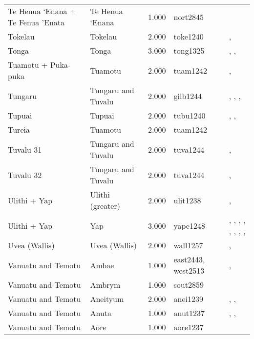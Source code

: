 \begin{longtable}{p{1.8cm}p{1.8cm}p{1.8cm}p{2cm}p{7cm}}
  Te Henua ‘Enana + Te Fenua ’Enata & Te Henua ‘Enana & 1.000 & nort2845 & \citet{sahlins1958social} \\ 
  Tokelau & Tokelau & 2.000 & toke1240 & \citet{hooper1973demographic}, \citet{macgregor1937} \\ 
  Tonga & Tonga & 3.000 & tong1325 & \citet{kirch1984evolution}, \citet{cummins1977tongan}, \citet{ferdon1988early} \\ 
  Tuamotu + Puka-puka & Tuamotu & 2.000 & tuam1242 & \citet{emory1975material}, \citet{emory1975material} \\ 
  Tungaru & Tungaru and Tuvalu & 2.000 & gilb1244 & \citet{lambert1966}, \citet{lambert1975makin}, \citet{lambert1991}, \citet{macdonald1982cinderellas} \\ 
  Tupuai & Tupuai & 2.000 & tubu1240 & \citet{aitken1930ethnology}, \citet{bollt2008excavations}, \citet{edwards2003archaeological} \\ 
  Tureia & Tuamotu & 2.000 & tuam1242 & \citet{emory1975material} \\ 
  Tuvalu 31 & Tungaru and Tuvalu & 2.000 & tuva1244 & \citet{macdonald1982cinderellas}, \citet{goldsmith1991} \\ 
  Tuvalu 32 & Tungaru and Tuvalu & 2.000 & tuva1244 & \citet{macdonald1982cinderellas}, \citet{goldsmith1991} \\ 
  Ulithi + Yap & Ulithi (greater) & 2.000 & ulit1238 & \citet{lessa1950}, \citet{lessa1966} \\ 
  Ulithi + Yap & Yap & 3.000 & yape1248 & \citet{huntetal1949}, \citet{muller1917}, \citet{murdocketal1944b}, \citet{salesius1906}, \citet{schneider1953}, \citet{schneider1957_yap}, \citet{schneider1962}, \citet{tetens_savages}, \citet{tetensandkubary1873} \\ 
  Uvea (Wallis) & Uvea (Wallis) & 2.000 & wall1257 & \citet{burrows1937}, \citet{pollock1995power} \\ 
  Vanuatu and Temotu & Ambae & 1.000 & east2443, west2513 & \citet{bonnemaison1972systeme}, \citet{bonnemaison1972systeme} \\ 
  Vanuatu and Temotu & Ambrym & 1.000 & sout2859 & \citet{tonkinson1981church} \\ 
  Vanuatu and Temotu & Aneityum & 2.000 & anei1239 & \citet{humphreys1926}, \citet{spriggs1982taro}, \citet{spriggs1986landscape} \\ 
  Vanuatu and Temotu & Anuta & 1.000 & anut1237 & \citet{feinberg1988socio}, \citet{feinberg1991}, \citet{kirch2002te} \\ 
  Vanuatu and Temotu & Aore & 1.000 & aore1237 & \citet{bonnemaison1996power} \\ 

\end{longtable}
